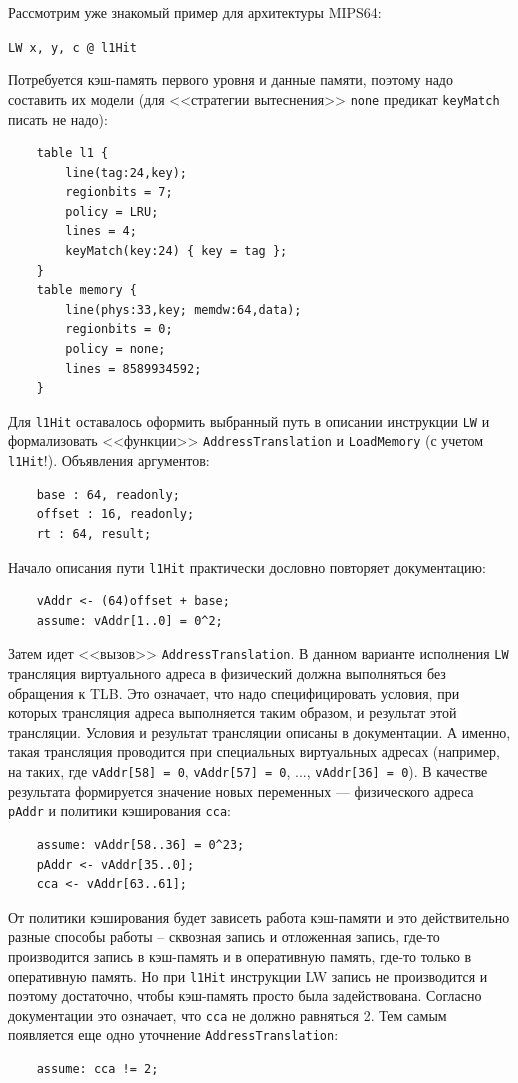 Рассмотрим уже знакомый пример для архитектуры MIPS64:

\texttt{LW x, y, c @ l1Hit}

Потребуется кэш-память первого уровня и данные памяти, поэтому надо составить их
модели (для <<стратегии вытеснения>> \texttt{none} предикат \texttt{keyMatch}
писать не надо):
\begin{verbatim}
    table l1 {
        line(tag:24,key);
        regionbits = 7;
        policy = LRU;
        lines = 4;
        keyMatch(key:24) { key = tag };
    }
    table memory {
        line(phys:33,key; memdw:64,data);
        regionbits = 0;
        policy = none;
        lines = 8589934592;
    }
\end{verbatim}

Для \texttt{l1Hit} оставалось оформить выбранный путь в описании инструкции
\texttt{LW} и формализовать <<функции>> \texttt{AddressTranslation} и
\texttt{LoadMemory} (с учетом \texttt{l1Hit}!). Объявления аргументов:
\begin{verbatim}
    base : 64, readonly;
    offset : 16, readonly;
    rt : 64, result;
\end{verbatim}

Начало описания пути \texttt{l1Hit} практически дословно повторяет документацию:
\begin{verbatim}
    vAddr <- (64)offset + base;
    assume: vAddr[1..0] = 0^2;
\end{verbatim}

Затем идет <<вызов>> \texttt{AddressTranslation}. В данном варианте исполнения
\texttt{LW} трансляция виртуального адреса в физический должна выполняться без
обращения к TLB. Это означает, что надо специфицировать условия, при которых
трансляция адреса выполняется таким образом, и результат этой трансляции.
Условия и результат трансляции описаны в документации. А именно, такая
трансляция проводится при специальных виртуальных адресах (например, на таких,
где \texttt{vAddr[58] = 0}, \texttt{vAddr[57] = 0}, ..., \texttt{vAddr[36] =
0}). В качестве результата формируется значение новых переменных --- физического
адреса \texttt{pAddr} и политики кэширования \texttt{cca}:
\begin{verbatim}
    assume: vAddr[58..36] = 0^23;
    pAddr <- vAddr[35..0];
    cca <- vAddr[63..61];
\end{verbatim}

От политики кэширования будет зависеть работа кэш-памяти и это действительно
разные способы работы -- сквозная запись и отложенная запись, где-то
производится запись в кэш-память и в оперативную память, где-то только в
оперативную память. Но при \texttt{l1Hit} инструкции LW запись не производится и
поэтому достаточно, чтобы кэш-память просто была задействована. Согласно
документации это означает, что \texttt{cca} не должно равняться 2. Тем самым
появляется еще одно уточнение \texttt{AddressTranslation}:
\begin{verbatim}
    assume: cca != 2;
\end{verbatim}

